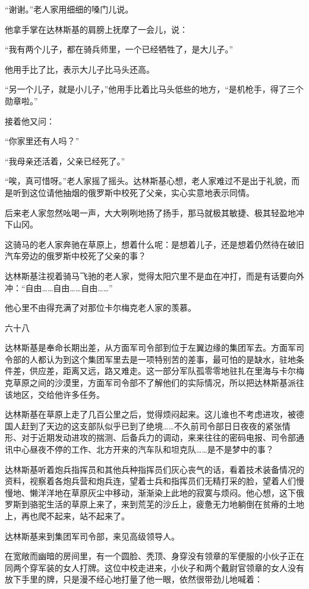 “谢谢。”老人家用细细的嗓门儿说。

他拿手掌在达林斯基的肩膀上抚摩了一会儿，说：

“我有两个儿子，都在骑兵师里，一个已经牺牲了，是大儿子。”

他用手比了比，表示大儿子比马头还高。

“另一个儿子，就是小儿子，”他用手比着比马头低些的地方，“是机枪手，得了三个勋章啦。”

接着他又问：

“你家里还有人吗？”

“我母亲还活着，父亲已经死了。”

“唉，真可惜呀。”老人家摇了摇头。达林斯基心想，老人家难过不是出于礼貌，而是听到这位请他抽烟的俄罗斯中校死了父亲，实心实意地表示同情。

后来老人家忽然吆喝一声，大大咧咧地扬了扬手，那马就极其敏捷、极其轻盈地冲下山冈。

这骑马的老人家奔驰在草原上，想着什么呢：是想着儿子，还是想着仍然待在破旧汽车旁边的俄罗斯中校死了父亲的事？

达林斯基注视着骑马飞驰的老人家，觉得太阳穴里不是血在冲打，而是有话要向外冲：“自由……自由……自由……”

他心里不由得充满了对那位卡尔梅克老人家的羡慕。

六十八

达林斯基是奉命长期出差，从方面军司令部到位于左翼边缘的集团军去。方面军司令部的人都认为到这个集团军里去是一项特别苦的差事，最可怕的是缺水，驻地条件差，供应差，距离又远，路又难走。这一部分军队孤零零地驻扎在里海与卡尔梅克草原之间的沙漠里，方面军司令部不了解他们的实际情况，所以把达林斯基派往该地区，交给他许多任务。

达林斯基在草原上走了几百公里之后，觉得烦闷起来。这儿谁也不考虑进攻，被德国人赶到了天边的这支部队似乎已到了绝境……不久前司令部日日夜夜的紧张情形、对于近期发动进攻的揣测、后备兵力的调动，来来往往的密码电报、司令部通讯中心昼夜不停的工作、北方开来的汽车队和坦克队……是不是梦中的事？

达林斯基听着炮兵指挥员和其他兵种指挥员们灰心丧气的话，看着技术装备情况的资料，视察着各炮兵营和炮兵连，望着士兵和指挥员们无精打采的脸，望着人们慢慢地、懒洋洋地在草原灰尘中移动，渐渐染上此地的寂寞与烦闷。他心想，这下俄罗斯到骆驼生活的草原上来了，来到荒芜的沙丘上，疲惫无力地躺倒在贫瘠的土地上，再也爬不起来，站不起来了。

达林斯基来到集团军司令部，来见高级领导人。

在宽敞而幽暗的房间里，有一个圆脸、秃顶、身穿没有领章的军便服的小伙子正在同两个穿军装的女人打牌。这位中校走进来，小伙子和两个戴尉官领章的女人没有放下手里的牌，只是漫不经心地打量了他一眼，依然很带劲儿地喊着：

